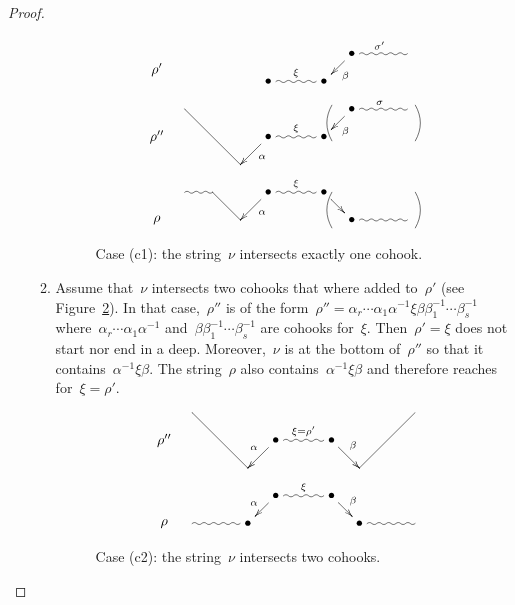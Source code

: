 \documentclass{amsart}
\theoremstyle{definition}
\begin{document}
\begin{proof}
\begin{enumerate}[(a)]
\begin{enumerate}[(c1)]
\begin{figure}[h]
 	\capstart
\[
\xy
%
(-35,7)*+{\rho''};
(-28,14)="peak";
(-14,0)="-12";
(-7,7)*+{\bullet}="-11";
(7,7)*+{\bullet}="11";
(14,14)*+{\bullet}="12";
(28,14)="14";
%
(-35,-14)*+{\rho};
(-28,-7)="-4";
(-21,-7)="-3";
(-14,-14)="-2";
(-7,-7)*+{\bullet}="-1";
(7,-7)*+{\bullet}="1";
(14,-14)*+{\bullet}="2";
(28,-14)="4";
%
{\ar@{-} "peak";"-12"};
{\ar^{\alpha} "-11";"-12"};
{\ar@{~}^\xi "-11";"11"};
{\ar^{\beta} "12";"11"};
{\ar@{~}^\sigma "12";"14"};
%
{\ar@/^.3pc/@{-} (30,15);(30,6)};
{\ar@/_.3pc/@{-} (9,15);(9,6)};
%
{\ar@/_.3pc/@{-} (30,-16);(30,-7)};
{\ar@/^.3pc/@{-} (9,-16);(9,-7)};
%
{\ar@{~} "-4";"-3"};
{\ar@{-} "-3";"-2"};
{\ar^{\alpha} "-1";"-2"};
{\ar@{~}^\xi "-1";"1"};
{\ar "1";"2"};
{\ar@{~} "2";"4"};
%
%
%
(-35,24)*+{\rho'};
(-7,21)*+{\bullet}="-21";
(7,21)*+{\bullet}="21";
(14,28)*+{\bullet}="22";
(28,28)="24";
%
{\ar@{~}^\xi "-21";"21"};
{\ar^{\beta} "22";"21"};
{\ar@{~}^{\sigma'} "22";"24"};
%
\endxy
\]
    \caption{Case (c1): the string~$\nu$ intersects exactly one cohook.}
    \label{fig: not tau compatible case c1}
    \vspace{-.3cm}
\end{figure}

\item Assume that~$\nu$ intersects two cohooks that where added to~$\rho'$ (see Figure~\ref{fig: not tau compatible case c2}).
In that case,~$\rho''$ is of the form~$\rho''=\alpha_r\cdots\alpha_1\alpha^{-1}\xi\beta\beta_1^{-1}\cdots\beta_s^{-1}$ where~$\alpha_r\cdots\alpha_1\alpha^{-1}$ and~$\beta\beta_1^{-1}\cdots\beta_s^{-1}$ are cohooks for~$\xi$.
Then~$\rho'=\xi$ does not start nor end in a deep.
Moreover,~$\nu$ is at the bottom of~$\rho''$ so that it contains~$\alpha^{-1}\xi\beta$.
The string~$\rho$ also contains~$\alpha^{-1}\xi\beta$ and therefore reaches for~$\xi=\rho'$.

\begin{figure}[h]
 	\capstart
\[
\xy
%
(-35,7)*+{\rho''};
(-28,14)="lpeak";
(-14,0)="-12";
(-7,7)*+{\bullet}="-11";
(7,7)*+{\bullet}="11";
(14,0)="12";
(28,14)="rpeak";
%
(-35,-14)*+{\rho};
(-28,-14)="-4";
(-14,-14)*+{\bullet}="-2";
(-7,-7)*+{\bullet}="-1";
(7,-7)*+{\bullet}="1";
(14,-14)*+{\bullet}="2";
(28,-14)="4";
%
{\ar@{-} "lpeak";"-12"};
{\ar_{\alpha} "-11";"-12"};
{\ar@{~}^{\xi=\rho'} "-11";"11"};
{\ar^{\beta} "11";"12"};
{\ar@{-} "12";"rpeak"};
%
{\ar@{~} "-4";"-2"};
{\ar_{\alpha} "-1";"-2"};
{\ar@{~}^\xi "-1";"1"};
{\ar^\beta "1";"2"};
{\ar@{~} "2";"4"};
%
\endxy
\]
    \caption{Case (c2): the string~$\nu$ intersects two cohooks.}
    \label{fig: not tau compatible case c2}
\end{figure}
%
\vspace*{-1.2cm}
\qedhere
\end{enumerate}
\end{enumerate}
\end{proof}
\end{document}
